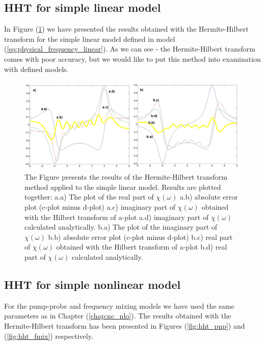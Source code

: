 \documentclass[12pt,twoside,a4paper]{article}
\numberwithin{equation}{subsection}
\numberwithin{figure}{subsection}
\begin{document}
\subsection{HHT for simple linear model} \label{chap:hermite_lin}

In Figure (\ref{fig:hht_lin}) we have presented the results obtained with the Hermite-Hilbert transform for the simple
linear model defined in model (\ref{eq:physical_frequency_linear}). As we can see - the Hermite-Hilbert transform comes with poor accuracy,
but we would like to put this method into examination with defined models.

\begin{figure} 
  \includegraphics[width=150mm]{img/hht_lin.png}
  \caption{ The Figure presents the results of the Hermite-Hilbert transform method applied to the simple linear model. Results are
  plotted together: 
   a.a) The plot of the real part of $\chi (\omega )$ 
   a.b) absolute error plot (c-plot minus d-plot) 
   a.c) imaginary part of $\chi (\omega )$ obtained with the Hilbert transform of a-plot 
   a.d) imaginary part of $\chi (\omega )$  calculated analytically. 
   b.a) The plot of the imaginary part of $\chi (\omega )$ 
   b.b) absolute error plot (c-plot minus d-plot) 
   b.c) real part of $\chi (\omega )$ obtained with the Hilbert transform of a-plot 
   b.d) real part of $\chi (\omega )$ calculated analytically. \label{fig:hht_lin}
  }
\end{figure}

\subsection{HHT for simple nonlinear model} \label{chap:hermite_nlo}

For the pump-probe and frequency mixing models we have used the same parameters as in Chapter (\ref{chap:nc_nlo}). The results
obtained with the Hermite-Hilbert transform has been presented in Figures (\ref{fig:hht_pnp}) and (\ref{fig:hht_fmix})
respectively.
\end{document}
